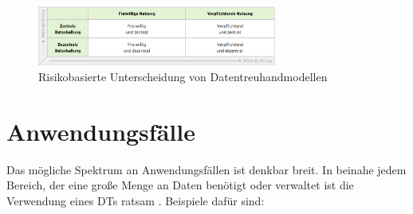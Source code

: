 \documentclass[
	fontsize=11pt,
	headings=small,
	parskip=half,           %
	bibliography=totoc,
	numbers=noenddot,       %
	open=any,               %
]{scrreprt}
\begin{document}
\begin{figure}
    \centering
    \includegraphics[width=0.7\textwidth]{DT-RisikoEinteilung.png}
    \caption{Risikobasierte Unterscheidung von Datentreuhandmodellen \cite{dt-blankertz2021neue}}
    \label{fig:dt-risikoeinteilug}
\end{figure}

\section{Anwendungsfälle}
\label{sec:dt-usecases}
Das mögliche Spektrum an Anwendungsfällen ist denkbar breit. In beinahe jedem Bereich, der eine große Menge an Daten benötigt oder verwaltet ist die Verwendung eines DTs ratsam \cite{dt-blankertz2021regulierung,dt-blankertz2021neue, dt-bundesdruckereiDatentreuhänder}. Beispiele dafür sind:
\end{document}
